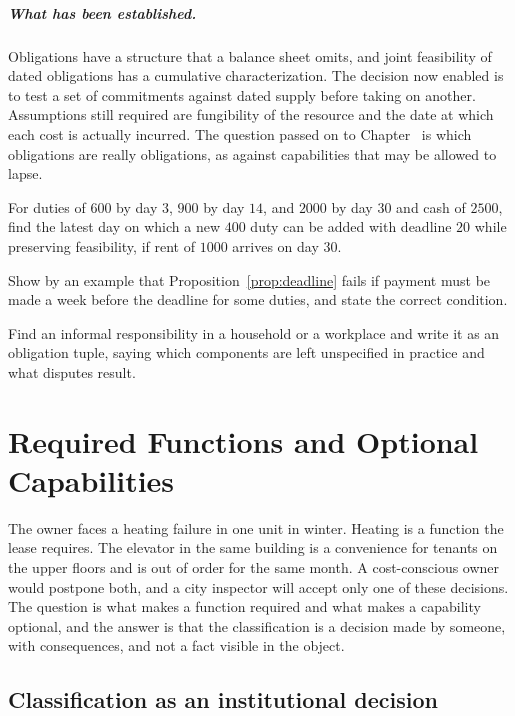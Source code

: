 \paragraph{What has been established.} Obligations have a structure that a balance sheet omits, and joint feasibility of dated obligations has a cumulative characterization. The decision now enabled is to test a set of commitments against dated supply before taking on another. Assumptions still required are fungibility of the resource and the date at which each cost is actually incurred. The question passed on to Chapter~ is which obligations are really obligations, as against capabilities that may be allowed to lapse.

\begin{exercise}
For duties of $600$ by day $3$, $900$ by day $14$, and $2000$ by day $30$ and cash of $2500$, find the latest day on which a new $400$ duty can be added with deadline $20$ while preserving feasibility, if rent of $1000$ arrives on day $30$.
\end{exercise}
\begin{exercise}
Show by an example that Proposition~\ref{prop:deadline} fails if payment must be made a week before the deadline for some duties, and state the correct condition.
\end{exercise}
\begin{exercise}
Find an informal responsibility in a household or a workplace and write it as an obligation tuple, saying which components are left unspecified in practice and what disputes result.
\end{exercise}

\chapter{Required Functions and Optional Capabilities}\label{ch:12}

The owner faces a heating failure in one unit in winter. Heating is a function the lease requires. The elevator in the same building is a convenience for tenants on the upper floors and is out of order for the same month. A cost-conscious owner would postpone both, and a city inspector will accept only one of these decisions. The question is what makes a function required and what makes a capability optional, and the answer is that the classification is a decision made by someone, with consequences, and not a fact visible in the object.

\section{Classification as an institutional decision}

